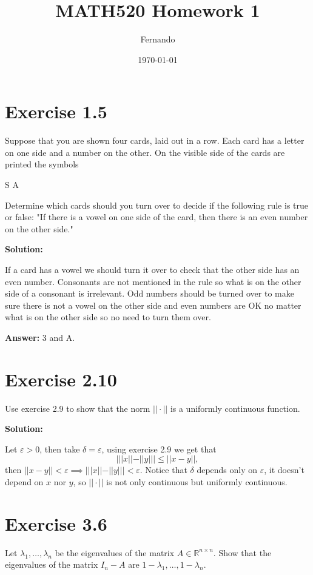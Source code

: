 \documentclass{article}
\begin{document}
\title{MATH520 Homework 1}
\author{Fernando}
\date{\today}
\maketitle

\section*{Exercise 1.5}
Suppose that you are shown four cards, laid out in a row. Each card has a letter on one side and a number on the other. On the visible side of the cards are printed the symbols

\begin{center}
S   \quad A
\end{center}

Determine which cards should you turn over to decide if the following rule is true or false: "If there is a vowel on one side of the card, then there is an even number on the other side."

\textbf{Solution:}

If a card has a vowel we should turn it over to check that the other side has
an even number. Consonants are not mentioned in the rule so what is on the
other side of a consonant is irrelevant. Odd numbers should be turned over to
make sure there is not a vowel on the other side and even numbers are OK no
matter what is on the other side so no need to turn them over.

\textbf{Answer:} 3 and A.
\section*{Exercise 2.10}
Use exercise 2.9 to show that the norm $||\cdot||$ is a uniformly continuous
function.

\textbf{Solution:}

Let $\varepsilon >0$, then take $\delta = \varepsilon$, using exercise 2.9 we
get that
\[
	|||x||-||y|||\leq ||x-y||,
\]
then $||x-y||<\varepsilon \implies |||x||-||y|||<\varepsilon$. Notice that
$\delta$ depends only on $\varepsilon$, it doesn't depend on $x$ nor $y$, so
$||\cdot||$ is not only continuous but uniformly continuous.
\section*{Exercise 3.6}
Let $\lambda_1,\dots,\lambda_n$ be the eigenvalues of the matrix $A\in
\mathbb{R}^{n\times n}$. Show that the eigenvalues of the matrix $I_n -A$ are
$1-\lambda_1,\dots,1-\lambda_n$.
\end{document}
